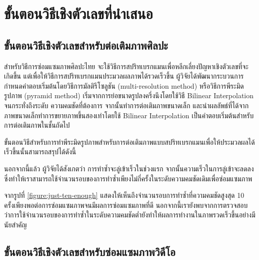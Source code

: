 \section{ขั้นตอนวิธีเชิงตัวเลขที่นำเสนอ}
\subsection{ขั้นตอนวิธีเชิงตัวเลขสำหรับต่อเติมภาพศิลปะ}

\hspace{1cm} สำหรับวิธีการซ่อมแซมภาพศิลปะไทย จะใช้วิธีการสปริทเบรกแมนเพื่อหลีกเลี่ยงปัญหาเชิงตัวเลขที่จะเกิดขึ้น แต่เพื่อให้วิธีการสปริทเบรกแมนประมวลผลภาพได้รวดเร็วขึ้น ผู้วิจัยได้พัฒนากระบวนการกำหนดคำตอบเริ่มต้นโดยวิธีการมัลติรีโซลูชัน (multi-resolution method) หรือวิธีการพีระมิดรูปภาพ (pyramid method) \cite{ref:image-pyramid}
เริ่มจากการย่อขนาดรูปลงครึ่งนึงโดยใช้วิธี Bilinear Interpolation จนกระทั่งถึงระดับ \break ความคมชัดที่ต้องการ จากนั้นทำการต่อเติมภาพขนาดเล็ก และนำผลลัพธ์ที่ได้จากภาพขนาดเล็กทำการขยายภาพขึ้นสองเท่าโดยใช้ Bilinear Interpolation เป็นคำตอบเริ่มต้นสำหรับการต่อเติมภาพในชั้นถัดไป

\hspace{1cm} ขั้นตอนวิธีสำหรับการทำพีระมิดรูปภาพสำหรับการต่อเติมภาพแบบสปริทเบรกแมนเพื่อให้ประมวลผลได้เร็วขึ้นนั้นสามารถสรุปได้ดังนี้\\




\vspace{0.5cm}



\hspace{1cm} นอกจากนี้แล้ว ผู้วิจัยได้สังเกตว่า การทำซ้ำจะลู่เข้าเร็วในช่วงแรก จากนั้นความเร็วในการลู่เข้าจะลดลง ซึ่งทำให้เราสามารถใช้จำนวนรอบของการทำซ้ำเพียงไม่กี่ครั้งในระดับความคมชัดเดิมเพื่อซ่อมแซมภาพ



\hspace{1cm} 
จากรูปที่ \ref{figure:just-ten-enough}
แสดงให้เห็นถึงจำนวนรอบการทำซ้ำที่ความคมชัดสูงสุด 10 ครั้งเพียงพอต่อการซ่อมแซมภาพจนมีผลการซ่อมแซมภาพที่ดี นอกจากนี้เรายังพบจากการตรวจสอบว่าการใช้จำนวนรอบของการทำซ้ำในระดับความคมชัดต่ำยังทำให้ผลการทำงานในภาพรวดเร็วขึ้นอย่างมีนัยสำคัญ

\subsection{ขั้นตอนวิธีเชิงตัวเลขสำหรับซ่อมแซมภาพวิดีโอ}

